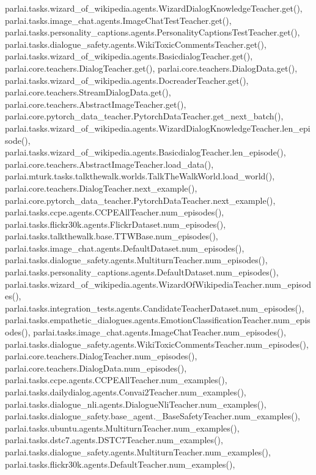 parlai.\+tasks.\+wizard\+\_\+of\+\_\+wikipedia.\+agents.\+Wizard\+Dialog\+Knowledge\+Teacher.\+get(), parlai.\+tasks.\+image\+\_\+chat.\+agents.\+Image\+Chat\+Test\+Teacher.\+get(), parlai.\+tasks.\+personality\+\_\+captions.\+agents.\+Personality\+Captions\+Test\+Teacher.\+get(), parlai.\+tasks.\+dialogue\+\_\+safety.\+agents.\+Wiki\+Toxic\+Comments\+Teacher.\+get(), parlai.\+tasks.\+wizard\+\_\+of\+\_\+wikipedia.\+agents.\+Basicdialog\+Teacher.\+get(), parlai.\+core.\+teachers.\+Dialog\+Teacher.\+get(), parlai.\+core.\+teachers.\+Dialog\+Data.\+get(), parlai.\+tasks.\+wizard\+\_\+of\+\_\+wikipedia.\+agents.\+Docreader\+Teacher.\+get(), parlai.\+core.\+teachers.\+Stream\+Dialog\+Data.\+get(), parlai.\+core.\+teachers.\+Abstract\+Image\+Teacher.\+get(), parlai.\+core.\+pytorch\+\_\+data\+\_\+teacher.\+Pytorch\+Data\+Teacher.\+get\+\_\+next\+\_\+batch(), parlai.\+tasks.\+wizard\+\_\+of\+\_\+wikipedia.\+agents.\+Wizard\+Dialog\+Knowledge\+Teacher.\+len\+\_\+episode(), parlai.\+tasks.\+wizard\+\_\+of\+\_\+wikipedia.\+agents.\+Basicdialog\+Teacher.\+len\+\_\+episode(), parlai.\+core.\+teachers.\+Abstract\+Image\+Teacher.\+load\+\_\+data(), parlai.\+mturk.\+tasks.\+talkthewalk.\+worlds.\+Talk\+The\+Walk\+World.\+load\+\_\+world(), parlai.\+core.\+teachers.\+Dialog\+Teacher.\+next\+\_\+example(), parlai.\+core.\+pytorch\+\_\+data\+\_\+teacher.\+Pytorch\+Data\+Teacher.\+next\+\_\+example(), parlai.\+tasks.\+ccpe.\+agents.\+C\+C\+P\+E\+All\+Teacher.\+num\+\_\+episodes(), parlai.\+tasks.\+flickr30k.\+agents.\+Flickr\+Dataset.\+num\+\_\+episodes(), parlai.\+tasks.\+talkthewalk.\+base.\+T\+T\+W\+Base.\+num\+\_\+episodes(), parlai.\+tasks.\+image\+\_\+chat.\+agents.\+Default\+Dataset.\+num\+\_\+episodes(), parlai.\+tasks.\+dialogue\+\_\+safety.\+agents.\+Multiturn\+Teacher.\+num\+\_\+episodes(), parlai.\+tasks.\+personality\+\_\+captions.\+agents.\+Default\+Dataset.\+num\+\_\+episodes(), parlai.\+tasks.\+wizard\+\_\+of\+\_\+wikipedia.\+agents.\+Wizard\+Of\+Wikipedia\+Teacher.\+num\+\_\+episodes(), parlai.\+tasks.\+integration\+\_\+tests.\+agents.\+Candidate\+Teacher\+Dataset.\+num\+\_\+episodes(), parlai.\+tasks.\+empathetic\+\_\+dialogues.\+agents.\+Emotion\+Classification\+Teacher.\+num\+\_\+episodes(), parlai.\+tasks.\+image\+\_\+chat.\+agents.\+Image\+Chat\+Teacher.\+num\+\_\+episodes(), parlai.\+tasks.\+dialogue\+\_\+safety.\+agents.\+Wiki\+Toxic\+Comments\+Teacher.\+num\+\_\+episodes(), parlai.\+core.\+teachers.\+Dialog\+Teacher.\+num\+\_\+episodes(), parlai.\+core.\+teachers.\+Dialog\+Data.\+num\+\_\+episodes(), parlai.\+tasks.\+ccpe.\+agents.\+C\+C\+P\+E\+All\+Teacher.\+num\+\_\+examples(), parlai.\+tasks.\+dailydialog.\+agents.\+Convai2\+Teacher.\+num\+\_\+examples(), parlai.\+tasks.\+dialogue\+\_\+nli.\+agents.\+Dialogue\+Nli\+Teacher.\+num\+\_\+examples(), parlai.\+tasks.\+dialogue\+\_\+safety.\+base\+\_\+agent.\+\_\+\+Base\+Safety\+Teacher.\+num\+\_\+examples(), parlai.\+tasks.\+ubuntu.\+agents.\+Multiturn\+Teacher.\+num\+\_\+examples(), parlai.\+tasks.\+dstc7.\+agents.\+D\+S\+T\+C7\+Teacher.\+num\+\_\+examples(), parlai.\+tasks.\+dialogue\+\_\+safety.\+agents.\+Multiturn\+Teacher.\+num\+\_\+examples(), parlai.\+tasks.\+flickr30k.\+agents.\+Default\+Teacher.\+num\+\_\+examples(), 